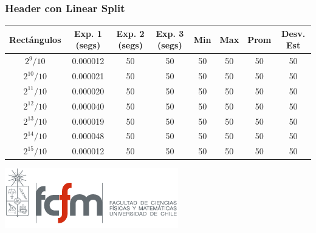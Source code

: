 \documentclass[letterpaper,10pt]{article}
\begin{document}
	\subsubsection{Header con Linear Split}
	\begin{center}

		\begin{tabular}{|c|c|c|c|c|c|c|c|}
			\hline
			Rectángulos	& Exp. 1 (segs) & Exp. 2 (segs) & Exp. 3 (segs) & Min & Max & Prom & Desv. Est\\
			\hline
			$2^{9}/10$ 	& 0.000012 & 50 	& 50 	& 50 	& 50 	& 50 	& 50 \\
			\hline
			$2^{10}/10$ 	& 0.000021 & 50 	& 50 	& 50 	& 50 	& 50 	& 50 \\
			\hline
			$2^{11}/10$ 	& 0.000020 & 50 	& 50 	& 50 	& 50 	& 50 	& 50 \\
			\hline
			$2^{12}/10$ 	& 0.000040 & 50 	& 50 	& 50 	& 50 	& 50 	& 50 \\
			\hline
			$2^{13}/10$ 	& 0.000019 & 50 	& 50 	& 50 	& 50 	& 50 	& 50 \\
			\hline
			$2^{14}/10$ 	& 0.000048 & 50 	& 50 	& 50 	& 50 	& 50 	& 50 \\
			\hline
			$2^{15}/10$ 	& 0.000012 & 50 	& 50 	& 50 	& 50 	& 50 	& 50 \\
			\hline
		\end{tabular}

		\includegraphics{logoFCFM.png}
	\end{center}
\end{document}
